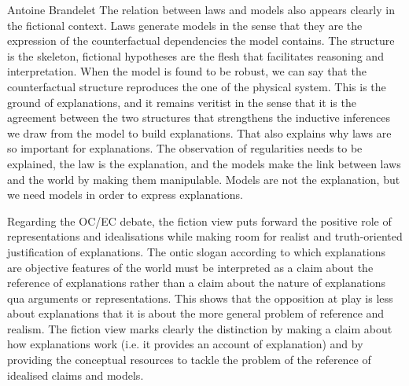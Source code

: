 \begin{artengenv}{Antoine Brandelet}
The relation between laws and models also appears clearly in the fictional context. Laws generate models in the sense that they are the expression of the counterfactual dependencies the model contains. The structure is the skeleton, fictional hypotheses are the flesh that facilitates reasoning and interpretation. When the model is found to be robust, we can say that the counterfactual structure reproduces the one of the physical system. This is the ground of explanations, and it remains veritist in the sense that it is the agreement between the two structures that strengthens the inductive inferences we draw from the model to build explanations. That also explains why laws are so important for explanations. The observation of regularities needs to be explained, the law is the explanation, and the models make the link between laws and the world by making them manipulable. Models are not the explanation, but we need models in order to express explanations.

Regarding the OC/EC debate, the fiction view puts forward the positive role of representations and idealisations while making room for realist and truth-oriented justification of explanations. The ontic slogan according to which explanations are objective features of the world must be interpreted as a claim about the reference of explanations rather than a claim about the nature of explanations qua arguments or representations. This shows that the opposition at play is less about explanations that it is about the more general problem of reference and realism. The fiction view marks clearly the distinction by making a claim about how explanations work (i.e. it provides an account of explanation) and by providing the conceptual resources to tackle the problem of the reference of idealised claims and models.


\end{artengenv}
